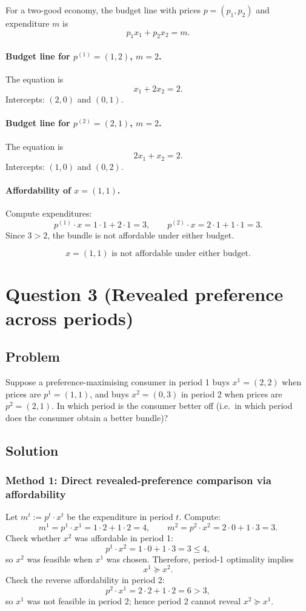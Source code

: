 \documentclass[12pt]{article}
\begin{document}
For a two-good economy, the budget line with prices \(p=(p_1,p_2)\) and expenditure \(m\) is
\[
p_1 x_1 + p_2 x_2 = m.
\]

\paragraph{Budget line for \(p^{(1)}=(1,2)\), \(m=2\).}
The equation is
\[
x_1 + 2x_2 = 2.
\]
Intercepts: \((2,0)\) and \((0,1)\).

\paragraph{Budget line for \(p^{(2)}=(2,1)\), \(m=2\).}
The equation is
\[
2x_1 + x_2 = 2.
\]
Intercepts: \((1,0)\) and \((0,2)\).

\paragraph{Affordability of \(x=(1,1)\).}
Compute expenditures:
\[
p^{(1)}\cdot x = 1\cdot 1 + 2\cdot 1 = 3,\qquad
p^{(2)}\cdot x = 2\cdot 1 + 1\cdot 1 = 3.
\]
Since \(3>2\), the bundle is not affordable under either budget.

\[
\boxed{\text{\(x=(1,1)\) is not affordable under either budget.}}
\]



\newpage
\section*{Question 3 (Revealed preference across periods)}
\subsection*{Problem}
Suppose a preference-maximising consumer in period 1 buys \(x^{1}=(2,2)\) when prices are \(p^{1}=(1,1)\),
and buys \(x^{2}=(0,3)\) in period 2 when prices are \(p^{2}=(2,1)\).
In which period is the consumer better off (i.e.\ in which period does the consumer obtain a better bundle)?

\subsection*{Solution}

\subsubsection*{Method 1: Direct revealed-preference comparison via affordability}
Let \(m^t:=p^t\cdot x^t\) be the expenditure in period \(t\). Compute:
\[
m^1 = p^1\cdot x^1 = 1\cdot 2 + 1\cdot 2 = 4,\qquad
m^2 = p^2\cdot x^2 = 2\cdot 0 + 1\cdot 3 = 3.
\]
Check whether \(x^2\) was affordable in period 1:
\[
p^1\cdot x^2 = 1\cdot 0 + 1\cdot 3 = 3 \le 4,
\]
so \(x^2\) was feasible when \(x^1\) was chosen. Therefore, period-1 optimality implies
\[
x^1 \succeq x^2.
\]
Check the reverse affordability in period 2:
\[
p^2\cdot x^1 = 2\cdot 2 + 1\cdot 2 = 6 > 3,
\]
so \(x^1\) was not feasible in period 2; hence period 2 cannot reveal \(x^2\succeq x^1\).
\end{document}
